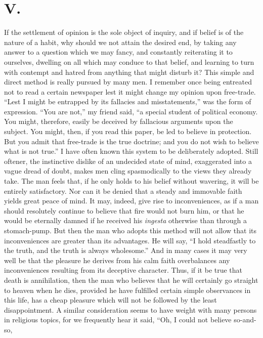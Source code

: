\section*{V.}

If the settlement of opinion is the sole object of inquiry, and if
belief is of the nature of a habit, why should we not attain the
desired end, by taking any answer to a question which we may fancy,
and constantly reiterating it to ourselves, dwelling on all which may
conduce to that belief, and learning to turn with contempt and hatred
from anything that might disturb it? This simple and direct method is
really pursued by many men. I remember once being entreated not to
read a certain newspaper lest it might change my opinion upon
free-trade. ``Lest I might be entrapped by its fallacies and
misstatements,'' was the form of expression. ``You are not,'' my
friend said, ``a special student of political economy. You might,
therefore, easily be deceived by fallacious arguments upon the
subject. You might, then, if you read this paper, be led to believe in
protection. But you admit that free-trade is the true doctrine; and
you do not wish to believe what is not true.'' I have often known this
system to be deliberately adopted. Still oftener, the instinctive
dislike of an undecided state of mind, exaggerated into a vague dread
of doubt, makes men cling spasmodically to the views they already
take. The man feels that, if he only holds to his belief without
wavering, it will be entirely satisfactory. Nor can it be denied that
a steady and immovable faith yields great peace of mind. It may,
indeed, give rise to inconveniences, as if a man should resolutely
continue to believe that fire would not burn him, or that he would be
eternally damned if he received his \textit{ingesta} otherwise than
through a stomach-pump. But then the man who adopts this method will
not allow that its inconveniences are greater than its advantages. He
will say, ``I hold steadfastly to the truth, and the truth is always
wholesome.'' And in many cases it may very well be that the pleasure
he derives from his calm faith overbalances any inconveniences
resulting from its deceptive character. Thus, if it be true that death
is annihilation, then the man who believes that he will certainly go
straight to heaven when he dies, provided he have fulfilled certain
simple observances in this life, has a cheap pleasure which will not
be followed by the least disappointment. A similar consideration seems
to have weight with many persons in religious topics, for we
frequently hear it said, ``Oh,  I could not believe so-and-so,
